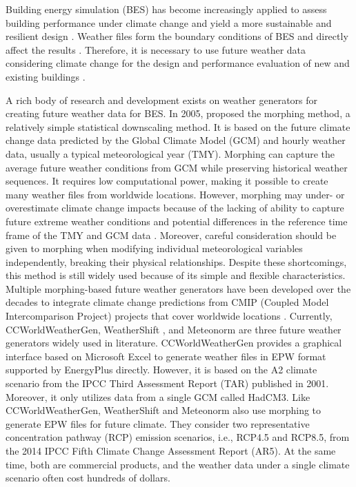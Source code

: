 \documentclass[twocolumn, a4paper,10pt]{article}
\begin{document}
Building energy simulation (BES) has become increasingly applied to assess
building performance under climate change and yield a more sustainable and
resilient design \citep{yassaghi2019overview}. Weather files form the boundary
conditions of BES and directly affect the results \citep{bhandari2012evaluation}.
Therefore, it is necessary to use future weather data considering climate
change for the design and performance evaluation of new and existing buildings
\citep{picard2020robustness}.

A rich body of research and development exists on weather generators for
creating future weather data for BES. In 2005, \citet{belcher2005constructing} proposed
the morphing method, a relatively simple statistical downscaling
method. It is based on the future climate change data predicted by the Global
Climate Model (GCM) and hourly weather data, usually a typical meteorological
year (TMY). Morphing can capture the average future weather conditions from GCM
while preserving historical weather sequences. It requires low computational
power, making it possible to create many weather files from worldwide locations.
However, morphing may under- or overestimate climate change impacts because of
the lacking of ability to capture future extreme weather conditions and
potential differences in the reference time frame of the TMY and GCM data
\citep{moazami2019impacts}.
Moreover, careful consideration should be given to morphing when modifying
individual meteorological variables independently, breaking their physical
relationships. Despite these shortcomings, this method is still widely used
because of its simple and flexible characteristics.
Multiple morphing-based future weather
generators have been developed over the decades to integrate climate change
predictions from CMIP (Coupled Model Intercomparison Project) projects that
cover worldwide locations \citep{jentsch2008climate, troup2016morphing, dickinson2016generating, yassaghi2019overview}. Currently,
CCWorldWeatherGen\citep{jentsch2013transforming}, WeatherShift
\citep{dickinson2016generating}, and Meteonorm \citep{remund2020meteonorm} are three
future weather generators widely used in literature. CCWorldWeatherGen provides
a graphical interface based on Microsoft Excel to generate weather files in EPW
format supported by EnergyPlus directly. However, it is based on the A2 climate
scenario from the IPCC Third Assessment Report (TAR) published in 2001. Moreover,
it only utilizes data from a single GCM called HadCM3. Like CCWorldWeatherGen,
WeatherShift and Meteonorm also use morphing to generate EPW files for future
climate. They consider two representative concentration pathway (RCP) emission
scenarios, i.e., RCP4.5 and RCP8.5, from the 2014 IPCC Fifth Climate Change
Assessment Report (AR5). At the same time, both are commercial products, and the
weather data under a single climate scenario often cost hundreds of dollars.
\end{document}
